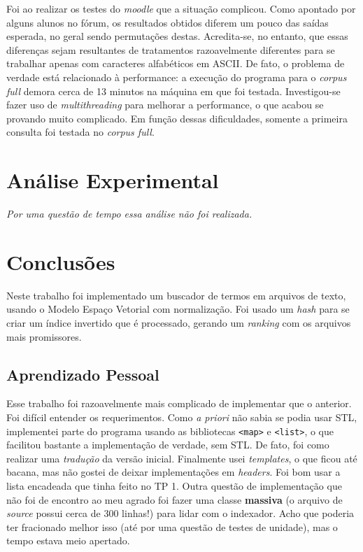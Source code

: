 \documentclass{article}
\def\code#1{\texttt{#1}}
\begin{document}
Foi ao realizar os testes do \textit{moodle} que a situação complicou. Como apontado por alguns alunos no fórum, os resultados obtidos diferem um pouco das saídas esperada, no geral sendo permutações destas. Acredita-se, no entanto, que essas diferenças sejam resultantes de tratamentos razoavelmente diferentes para se trabalhar apenas com caracteres alfabéticos em ASCII. De fato, o problema de verdade está relacionado à performance: a execução do programa para o \textit{corpus full} demora cerca de 13 minutos na máquina em que foi testada. Investigou-se fazer uso de \textit{multithreading} para melhorar a performance, o que acabou se provando muito complicado. Em função dessas dificuldades, somente a primeira consulta foi testada no \textit{corpus full}.

\section{Análise Experimental}

\textit{Por uma questão de tempo essa análise não foi realizada.}

\section{Conclusões}

Neste trabalho foi implementado um buscador de termos em arquivos de texto, usando o Modelo Espaço Vetorial com normalização. Foi usado um \textit{hash} para se criar um índice invertido que é processado, gerando um \textit{ranking} com os arquivos mais promissores.

\subsection{Aprendizado Pessoal}

Esse trabalho foi razoavelmente mais complicado de implementar que o anterior. Foi difícil entender os requerimentos. Como \textit{a priori} não sabia se podia usar STL, implementei parte do programa usando as bibliotecas \code{<map>} e \code{<list>}, o que facilitou bastante a implementação de verdade, sem STL. De fato, foi como realizar uma \textit{tradução} da versão inicial. Finalmente usei \textit{templates}, o que ficou até bacana, mas não gostei de deixar implementações em \textit{headers}. Foi bom usar a lista encadeada que tinha feito no TP 1. Outra questão de implementação que não foi de encontro ao meu agrado foi fazer uma classe \textbf{massiva} (o arquivo de \textit{source} possui cerca de 300 linhas!) para lidar com o indexador. Acho que poderia ter fracionado melhor isso (até por uma questão de testes de unidade), mas o tempo estava meio apertado.
\end{document}
